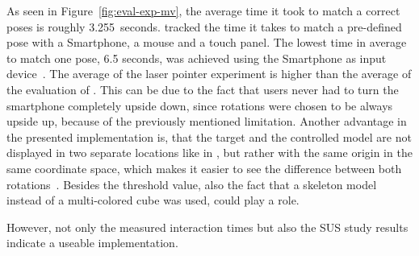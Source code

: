 \newcommand{\evalExpMvAvgPoses}{3.255} %
\newcommand{\evalExpMvStdPoses}{2.284}
\newcommand{\evalExpMvParticipants}{12}

%
As seen in Figure~\ref{fig:eval-exp-mv}, the average time it took to match a correct poses is roughly \evalExpMvAvgPoses\ seconds. \citeauthor{Katzakis.2010} tracked the time it takes to match a pre-defined pose with a Smartphone, a mouse and a touch panel. The lowest time in average to match one pose, 6.5 seconds, was achieved using the Smartphone as input device~\cite[140]{Katzakis.2010}. The average of the laser pointer experiment is higher than the average of the evaluation of \citeauthor{Katzakis.2010}. This can be due to the fact that users never had to turn the smartphone completely upside down, since rotations were chosen to be always upside up, because of the previously mentioned limitation. Another advantage in the presented implementation is, that the target and the controlled model are not displayed in two separate locations like in {}, but rather with the same origin in the same coordinate space, which makes it easier to see the difference between both rotations~\cite[140]{Katzakis.2010}. Besides the threshold value, also the fact that a skeleton model instead of a multi-colored cube was used, could play a role. 



However, not only the measured interaction times but also the \ac{SUS} study results indicate a useable implementation.


